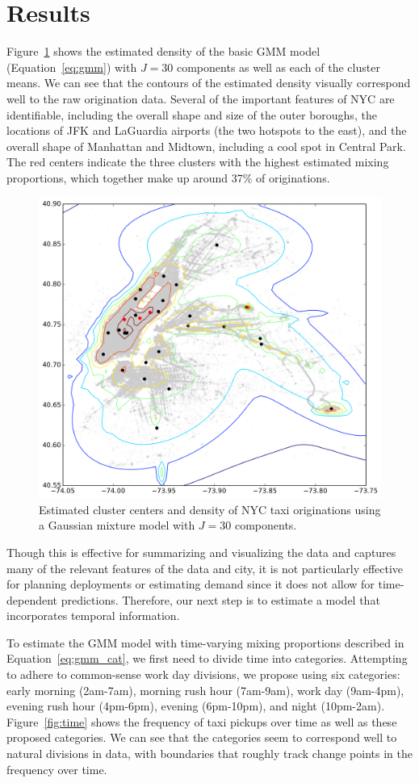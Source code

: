 \documentclass[12pt]{article}
\theoremstyle{definition}
\theoremstyle{algodesc}
\begin{document}
\section{Results}
Figure~\ref{fig:gmm_res} shows the estimated density of the basic GMM model (Equation~\ref{eq:gmm}) with $J=30$ components as well as each of the cluster means. We can see that the contours of the estimated density visually correspond well to the raw origination data. Several of the important features of NYC are identifiable, including the overall shape and size of the outer boroughs, the locations of JFK and LaGuardia airports (the two hotspots to the east), and the overall shape of Manhattan and Midtown, including a cool spot in Central Park. The red centers indicate the three clusters with the highest estimated mixing proportions, which together make up around 37\% of originations.

\begin{figure}[tb] \centering
  \includegraphics[width=0.8\linewidth]{./include/gmm_res.png}
  \caption{Estimated cluster centers and density of NYC taxi originations using a Gaussian mixture model with $J=30$ components.}
  \label{fig:gmm_res}
\end{figure}

Though this is effective for summarizing and visualizing the data and captures many of the relevant features of the data and city, it is not particularly effective for planning deployments or estimating demand since it does not allow for time-dependent predictions. Therefore, our next step is to estimate a model that incorporates temporal information.

To estimate the GMM model with time-varying mixing proportions described in Equation~\ref{eq:gmm_cat}, we first need to divide time into categories. Attempting to adhere to common-sense work day divisions, we propose using six categories: early morning (2am-7am), morning rush hour (7am-9am), work day (9am-4pm), evening rush hour (4pm-6pm), evening (6pm-10pm), and night (10pm-2am). Figure~\ref{fig:time} shows the frequency of taxi pickups over time as well as these proposed categories. We can see that the categories seem to correspond well to natural divisions in data, with boundaries that roughly track change points in the frequency over time.
\end{document}

